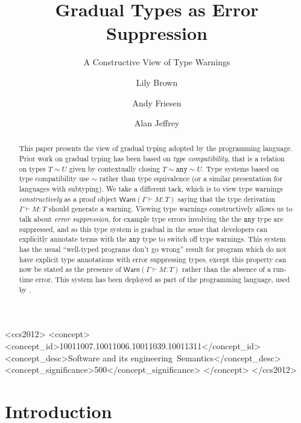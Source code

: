 \documentclass[acmsmall,review,screen]{acmart}
\newcommand{\ANY}{\mathtt{any}}
\newcommand{\WARN}{\mathsf{Warn}}
\newcommand{\compat}{\sim}
\begin{document}
\title{Gradual Types as Error Suppression}
\subtitle{A Constructive View of Type Warnings}

\author{Lily Brown}
\author{Andy Friesen}
\author{Alan Jeffrey}

\begin{abstract}
  This paper presents the view of gradual typing adopted by the
   programming language. Prior work on gradual typing has
  been based on \emph{type compatibility}, that is a relation on types
  $T \compat U$ given by contextually closing $T \compat \ANY \compat
  U$.  Type systems based on type compatibility use $\compat$ rather
  than type equivalence (or a similar presentation for languages with
  subtyping). We take a different tack, which is to view type warnings
  \emph{constructively} as a proof object $\WARN(\Gamma \vdash M : T)$
  saying that the type derivation $\Gamma \vdash M : T$ should
  generate a warning. Viewing type warnings constructively allows us
  to talk about \emph{error suppression}, for example type errors involving the the $\ANY$ type
  are suppressed, and so this type system is gradual in the
  sense that developers can explicitly annotate terms with the $\ANY$
  type to switch off type warnings. This system has the usual ``well-typed
  programs don't go wrong'' result for program which do not have
  explicit type annotations with error suppressing types, except this
  property can now be stated as the presence of $\WARN(\Gamma \vdash M
  : T)$ rather than the absence of a run-time error. This system has
  been deployed as part of the  programming language, used
  by .
\end{abstract}

\begin{CCSXML}
<ccs2012>
<concept>
<concept_id>10011007.10011006.10011039.10011311</concept_id>
<concept_desc>Software and its engineering~Semantics</concept_desc>
<concept_significance>500</concept_significance>
</concept>
</ccs2012>
\end{CCSXML}

\maketitle

\section{Introduction}
\end{document}

